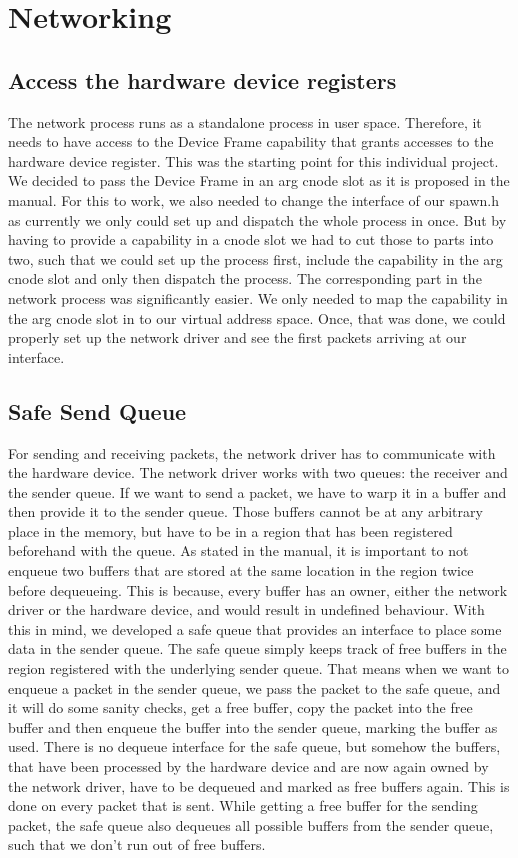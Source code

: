 \section{Networking}

\subsection{Access the hardware device registers}

The network process runs as a standalone process in user space. Therefore, it needs to have access to the Device Frame capability that grants accesses to the hardware device register. This was the starting point for this individual project. We decided to pass the Device Frame in an arg cnode slot as it is proposed in the manual. For this to work, we also needed to change the interface of our spawn.h as currently we only could set up and dispatch the whole process in once. But by having to provide a capability in a cnode slot we had to cut those to parts into two, such that we could set up the process first, include the capability in the arg cnode slot and only then dispatch the process.
The corresponding part in the network process was significantly easier. We only needed to map the capability in the arg cnode slot in to our virtual address space.
Once, that was done, we could properly set up the network driver and see the first packets arriving at our interface.


\subsection{Safe Send Queue}

For sending and receiving packets, the network driver has to communicate with the hardware device.
The network driver works with two queues: the receiver and the sender queue. If we want to send a packet, we have to warp it in a buffer and then provide it to the sender queue. Those buffers cannot be at any arbitrary place in the memory, but have to be in a region that has  been registered beforehand with the queue.
As stated in the manual, it is important to not enqueue two buffers that are stored at the same location in the region twice before dequeueing. This is because,  every buffer has an owner, either the network driver or the hardware device, and would result in undefined behaviour.
With this in mind, we developed a safe queue that provides an interface to place some data in the sender queue. The safe queue simply keeps track of free buffers in the region registered with the underlying sender queue. That means when we want to enqueue a packet in the sender queue, we pass the packet to the safe queue, and it will do some sanity checks, get a free buffer, copy the packet into the free buffer and then enqueue the buffer into the sender queue, marking the buffer as used.
There is no dequeue interface for the safe queue, but somehow the buffers, that have been processed by the hardware device and are now again owned by the network driver, have to be dequeued and marked as free buffers again. This is done on every packet that is sent. While getting a free buffer for the sending packet, the safe queue also dequeues all possible buffers from the sender queue, such that we don't run out of free buffers.

